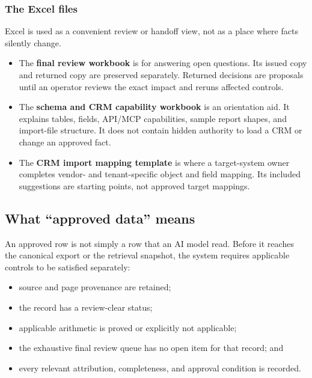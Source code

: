 \documentclass[
]{article}
\providecommand{\tightlist}{%
  \setlength{\itemsep}{0pt}\setlength{\parskip}{0pt}}
\begin{document}
\subsubsection{The Excel files}\label{the-excel-files}

Excel is used as a convenient review or handoff view, not as a place
where facts silently change.

\begin{itemize}
\tightlist
\item
  The \textbf{final review workbook} is for answering open questions.
  Its issued copy and returned copy are preserved separately. Returned
  decisions are proposals until an operator reviews the exact impact and
  reruns affected controls.
\item
  The \textbf{schema and CRM capability workbook} is an orientation aid.
  It explains tables, fields, API/MCP capabilities, sample report
  shapes, and import-file structure. It does not contain hidden
  authority to load a CRM or change an approved fact.
\item
  The \textbf{CRM import mapping template} is where a target-system
  owner completes vendor- and tenant-specific object and field mapping.
  Its included suggestions are starting points, not approved target
  mappings.
\end{itemize}

\subsection{What ``approved data''
means}\label{what-approved-data-means}

An approved row is not simply a row that an AI model read. Before it
reaches the canonical export or the retrieval snapshot, the system
requires applicable controls to be satisfied separately:

\begin{itemize}
\tightlist
\item
  source and page provenance are retained;
\item
  the record has a review-clear status;
\item
  applicable arithmetic is proved or explicitly not applicable;
\item
  the exhaustive final review queue has no open item for that record;
  and
\item
  every relevant attribution, completeness, and approval condition is
  recorded.
\end{itemize}
\end{document}
